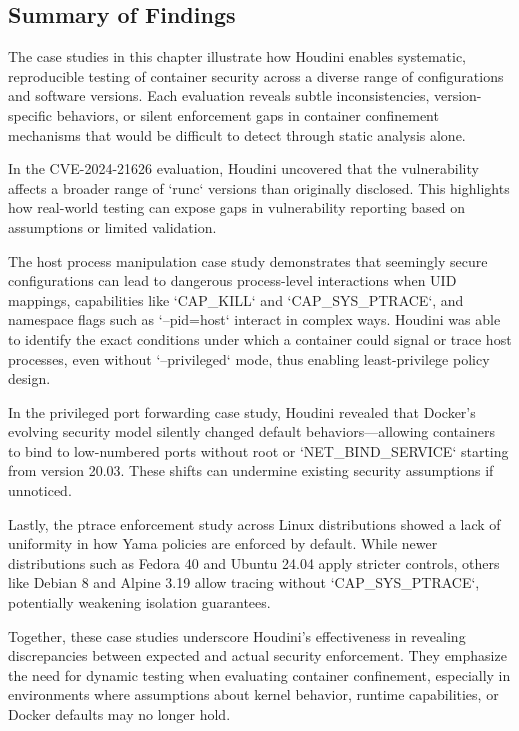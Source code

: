 \begin{doublespace}
\section{Summary of Findings}

The case studies in this chapter illustrate how Houdini enables systematic, reproducible testing of container security across a diverse range of configurations and software versions. Each evaluation reveals subtle inconsistencies, version-specific behaviors, or silent enforcement gaps in container confinement mechanisms that would be difficult to detect through static analysis alone.

In the CVE-2024-21626 evaluation, Houdini uncovered that the vulnerability affects a broader range of `runc` versions than originally disclosed. This highlights how real-world testing can expose gaps in vulnerability reporting based on assumptions or limited validation.

The host process manipulation case study demonstrates that seemingly secure configurations can lead to dangerous process-level interactions when UID mappings, capabilities like `CAP_KILL` and `CAP_SYS_PTRACE`, and namespace flags such as `--pid=host` interact in complex ways. Houdini was able to identify the exact conditions under which a container could signal or trace host processes, even without `--privileged` mode, thus enabling least-privilege policy design.

In the privileged port forwarding case study, Houdini revealed that Docker’s evolving security model silently changed default behaviors—allowing containers to bind to low-numbered ports without root or `NET_BIND_SERVICE` starting from version 20.03. These shifts can undermine existing security assumptions if unnoticed.

Lastly, the ptrace enforcement study across Linux distributions showed a lack of uniformity in how Yama policies are enforced by default. While newer distributions such as Fedora 40 and Ubuntu 24.04 apply stricter controls, others like Debian 8 and Alpine 3.19 allow tracing without `CAP_SYS_PTRACE`, potentially weakening isolation guarantees.

Together, these case studies underscore Houdini’s effectiveness in revealing discrepancies between expected and actual security enforcement. They emphasize the need for dynamic testing when evaluating container confinement, especially in environments where assumptions about kernel behavior, runtime capabilities, or Docker defaults may no longer hold.


\end{doublespace}
